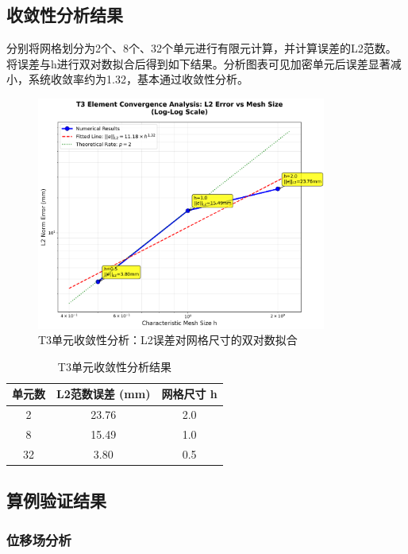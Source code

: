 \documentclass[12pt,a4paper]{article}
\begin{document}
\subsection{收敛性分析结果}

分别将网格划分为2个、8个、32个单元进行有限元计算，并计算误差的L2范数。将误差与h进行双对数拟合后得到如下结果。分析图表可见加密单元后误差显著减小，系统收敛率约为1.32，基本通过收敛性分析。

\begin{figure}[H]
\centering
\includegraphics[width=0.85\textwidth]{img/convergence_analysis.png}
\caption{T3单元收敛性分析：L2误差对网格尺寸的双对数拟合}
\label{fig:convergence_curve}
\end{figure}

\begin{table}[H]
\centering
\caption{T3单元收敛性分析结果}
\begin{tabular}{ccc}
\toprule
单元数 & L2范数误差 (mm) & 网格尺寸 h \\
\midrule
2 & 23.76 & 2.0 \\
8 & 15.49 & 1.0 \\
32 & 3.80 & 0.5 \\
\bottomrule
\end{tabular}
\end{table}

\subsection{算例验证结果}

\subsubsection{位移场分析}
\end{document}
